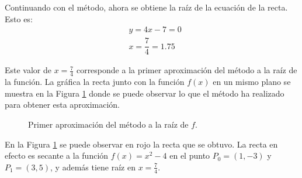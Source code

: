 \begin{exerciseT}
	Continuando con el método, ahora se obtiene la raíz de la ecuación de la recta. Esto es:
	\begin{align*}
		& y = 4x - 7 = 0 \\
		& x = \dfrac{7}{4} = 1.75
	\end{align*}

	Este valor de $x=\frac{7}{4}$ corresponde a la primer aproximación del método a la raíz de la función. 
	La gráfica la recta junto con la función $f(x)$ en un mismo plano se muestra en la Figura \ref{fig:Secante02} 
	donde se puede observar lo que el método ha realizado para obtener esta aproximación.

	\begin{figure}[H]
		\centering
		\caption{Primer aproximación del método a la raíz de $f$.}
		\label{fig:Secante02}
	\end{figure}

	En la Figura \ref{fig:Secante02} se puede observar en rojo la recta que se obtuvo. La recta en efecto
	es secante a la función $f(x)=x^2-4$ en el punto $P_0 = (1, -3)$ y $P_1 = (3, 5)$, y además tiene raíz 
	en $x=\frac{7}{4}$.


\end{exerciseT}
